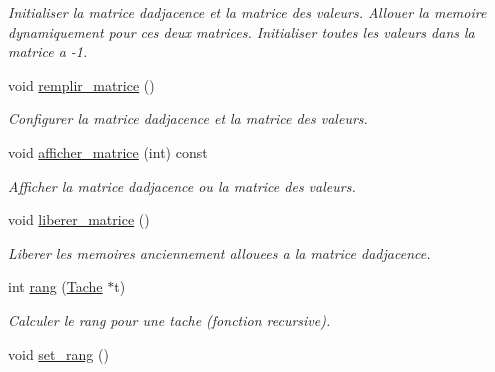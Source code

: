 \begin{DoxyCompactItemize}
\begin{DoxyCompactList}\small\item\em Initialiser la matrice d\textquotesingle{}adjacence et la matrice des valeurs. Allouer la memoire dynamiquement pour ces deux matrices. Initialiser toutes les valeurs dans la matrice a -\/1. \end{DoxyCompactList}\item 
void \hyperlink{structGraphe__ordonnancement_a8ea7abdedb4dd3e633e33a045c67d276}{remplir\+\_\+matrice} ()
\begin{DoxyCompactList}\small\item\em Configurer la matrice d\textquotesingle{}adjacence et la matrice des valeurs. \end{DoxyCompactList}\item 
void \hyperlink{structGraphe__ordonnancement_a15c6ff88b2c602e76eb1872b26b6cde9}{afficher\+\_\+matrice} (int) const 
\begin{DoxyCompactList}\small\item\em Afficher la matrice d\textquotesingle{}adjacence ou la matrice des valeurs. \end{DoxyCompactList}\item 
void \hyperlink{structGraphe__ordonnancement_abc46cb894b0b73c4ff38f643b4202d79}{liberer\+\_\+matrice} ()\hypertarget{structGraphe__ordonnancement_abc46cb894b0b73c4ff38f643b4202d79}{}\label{structGraphe__ordonnancement_abc46cb894b0b73c4ff38f643b4202d79}

\begin{DoxyCompactList}\small\item\em Liberer les memoires anciennement allouees a la matrice d\textquotesingle{}adjacence. \end{DoxyCompactList}\item 
int \hyperlink{structGraphe__ordonnancement_a4309a77a63954f00492c29b8da852822}{rang} (\hyperlink{structTache}{Tache} $\ast$t)
\begin{DoxyCompactList}\small\item\em Calculer le rang pour une tache (fonction recursive). \end{DoxyCompactList}\item 
void \hyperlink{structGraphe__ordonnancement_a230eaa6a41aba85c48bf7850bcb9460e}{set\+\_\+rang} ()\hypertarget{structGraphe__ordonnancement_a230eaa6a41aba85c48bf7850bcb9460e}{}\label{structGraphe__ordonnancement_a230eaa6a41aba85c48bf7850bcb9460e}


\end{DoxyCompactItemize}
